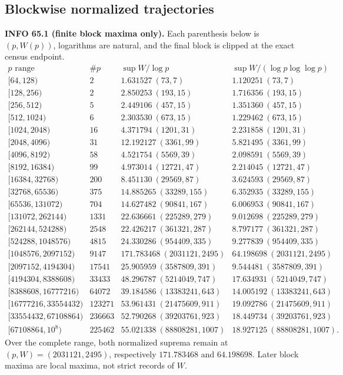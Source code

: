 \documentclass[10pt,reqno]{amsart}
\theoremstyle{definition}
\newcommand{\1}{\mathbf 1}
\begin{document}
\subsection{Blockwise normalized trajectories}
\medskip\noindent\textbf{INFO 65.1 (finite block maxima only).}
Each parenthesis below is $(p,W(p))$, logarithms are natural, and the final
block is clipped at the exact census endpoint.
\begingroup\tiny
\begin{equation}\tag{65.4}
\begin{array}{r|r|l|l}
p\text{ range}&\#p&\sup W/\log p&\sup W/(\log p\log\log p)\\ \hline
{[64,128)}&2&1.631527\ (73,7)&1.120251\ (73,7)\\
{[128,256)}&2&2.850253\ (193,15)&1.716356\ (193,15)\\
{[256,512)}&5&2.449106\ (457,15)&1.351360\ (457,15)\\
{[512,1024)}&6&2.303530\ (673,15)&1.229462\ (673,15)\\
{[1024,2048)}&16&4.371794\ (1201,31)&2.231858\ (1201,31)\\
{[2048,4096)}&31&12.192127\ (3361,99)&5.821495\ (3361,99)\\
{[4096,8192)}&58&4.521754\ (5569,39)&2.098591\ (5569,39)\\
{[8192,16384)}&99&4.973014\ (12721,47)&2.214045\ (12721,47)\\
{[16384,32768)}&200&8.451130\ (29569,87)&3.624593\ (29569,87)\\
{[32768,65536)}&375&14.885265\ (33289,155)&6.352935\ (33289,155)\\
{[65536,131072)}&704&14.627482\ (90841,167)&6.006953\ (90841,167)\\
{[131072,262144)}&1331&22.636661\ (225289,279)&9.012698\ (225289,279)\\
{[262144,524288)}&2548&22.426217\ (361321,287)&8.797177\ (361321,287)\\
{[524288,1048576)}&4815&24.330286\ (954409,335)&9.277839\ (954409,335)\\
{[1048576,2097152)}&9147&171.783468\ (2031121,2495)&64.198698\ (2031121,2495)\\
{[2097152,4194304)}&17541&25.905959\ (3587809,391)&9.544481\ (3587809,391)\\
{[4194304,8388608)}&33433&48.296787\ (5214049,747)&17.634931\ (5214049,747)\\
{[8388608,16777216)}&64072&39.184586\ (13383241,643)&14.005192\ (13383241,643)\\
{[16777216,33554432)}&123271&53.961431\ (21475609,911)&19.092786\ (21475609,911)\\
{[33554432,67108864)}&236663&52.790268\ (39203761,923)&18.449734\ (39203761,923)\\
{[67108864,10^8)}&225462&55.021338\ (88808281,1007)&18.927125\ (88808281,1007).
\end{array}
\end{equation}
\endgroup
Over the complete range, both normalized suprema remain at
$(p,W)=(2031121,2495)$, respectively $171.783468$ and $64.198698$.  Later
block maxima are local maxima, not strict records of $W$.
\end{document}
